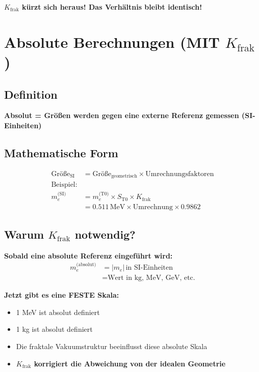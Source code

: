\documentclass[12pt,a4paper]{article}
\begin{document}
	\textbf{$K_{\text{frak}}$ kürzt sich heraus! Das Verhältnis bleibt identisch!}
	
	\section{Absolute Berechnungen (MIT $K_{\text{frak}}$)}
	
	\subsection{Definition}
	
	\textbf{Absolut = Größen werden gegen eine externe Referenz gemessen (SI-Einheiten)}
	
	\subsection{Mathematische Form}
	\begin{align*}
		\text{Größe}_{\text{SI}} &= \text{Größe}_{\text{geometrisch}} \times \text{Umrechnungsfaktoren} \\
		\text{Beispiel:} & \\
		m_e^{\text{(SI)}} &= m_e^{\text{(T0)}} \times S_{\text{T0}} \times K_{\text{frak}} \\
		&= 0.511\,\text{MeV} \times \text{Umrechnung} \times 0.9862
	\end{align*}
	
	\subsection{Warum $K_{\text{frak}}$ notwendig?}
	
	\textbf{Sobald eine absolute Referenz eingeführt wird:}
	\begin{align*}
		m_e^{\text{(absolut)}} &= |m_e|\,\text{in SI-Einheiten} \\
		&= \text{Wert in kg, MeV, GeV, etc.}
	\end{align*}
	
	\textbf{Jetzt gibt es eine FESTE Skala:}
	\begin{itemize}
		\item 1 MeV ist absolut definiert
		\item 1 kg ist absolut definiert  
		\item Die fraktale Vakuumstruktur beeinflusst diese absolute Skala
		\item \textbf{$K_{\text{frak}}$ korrigiert die Abweichung von der idealen Geometrie}
	\end{itemize}
	
\end{document}
